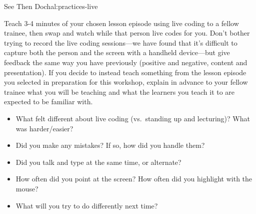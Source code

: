 \begin{challenge}{See Then Do}{chal:practices-live}

Teach 3-4 minutes of your chosen lesson episode using live coding to a
fellow trainee, then swap and watch while that person live codes for
you. Don't bother trying to record the live coding sessions---we have
found that it's difficult to capture both the person and the screen
with a handheld device---but give feedback the same way you have
previously (positive and negative, content and presentation). If you
decide to instead teach something from the lesson episode you selected
in preparation for this workshop, explain in advance to your fellow
trainee what you will be teaching and what the learners you teach it
to are expected to be familiar with.

\begin{itemize}

  \item
    What felt different about live coding (vs.~standing up and
    lecturing)? What was harder/easier?

  \item
    Did you make any mistakes? If so, how did you handle them?

  \item
    Did you talk and type at the same time, or alternate?

  \item
    How often did you point at the screen? How often did you highlight
    with the mouse?

  \item
    What will you try to do differently next time?

\end{itemize}

\end{challenge}
